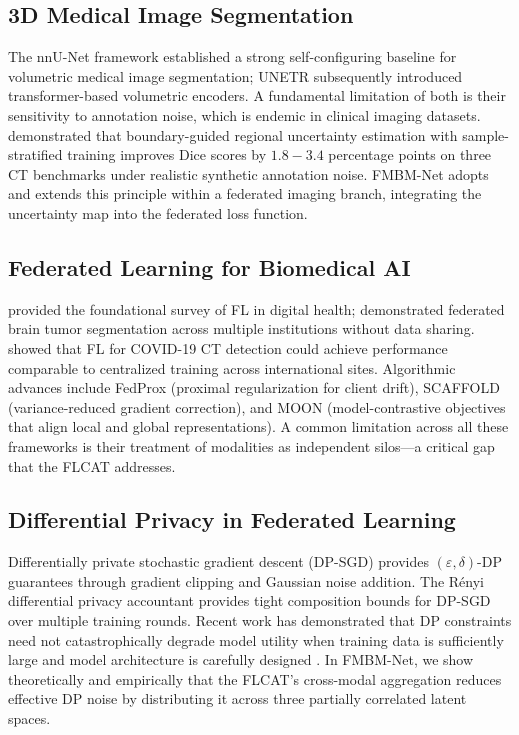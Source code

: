 \documentclass[a4paper,fleqn]{cas-dc}
\begin{document}
\subsection{3D Medical Image Segmentation}

The nnU-Net framework \citep{isensee2021nnunet} established a strong
self-configuring baseline for volumetric medical image segmentation;
UNETR \citep{hatamizadeh2022unetr} subsequently introduced transformer-based
volumetric encoders. A fundamental limitation of both is their sensitivity to
annotation noise, which is endemic in clinical imaging datasets.
\citet{rue_ct_2025} demonstrated that boundary-guided regional uncertainty
estimation with sample-stratified training improves Dice scores by
$1.8\!-\!3.4$ percentage points on three CT benchmarks under realistic
synthetic annotation noise. FMBM-Net adopts and extends this principle within a
federated imaging branch, integrating the uncertainty map into the federated
loss function.

\subsection{Federated Learning for Biomedical AI}

\citet{rieke2020fedhealth} provided the foundational survey of FL in digital
health; \citet{sheller2020braintumor} demonstrated federated brain tumor
segmentation across multiple institutions without data sharing.
\citet{dou2021fed} showed that FL for COVID-19 CT detection could achieve
performance comparable to centralized training across international sites.
Algorithmic advances include FedProx \citep{li2020fedprox} (proximal
regularization for client drift), SCAFFOLD \citep{karimireddy2020scaffold}
(variance-reduced gradient correction), and MOON \citep{li2021moon}
(model-contrastive objectives that align local and global representations).
A common limitation across all these frameworks is their treatment of modalities
as independent silos---a critical gap that the FLCAT addresses.

\subsection{Differential Privacy in Federated Learning}

Differentially private stochastic gradient descent (DP-SGD)
\citep{abadi2016dpsgd} provides $(\varepsilon,\delta)$-DP guarantees through
gradient clipping and Gaussian noise addition. The R\'{e}nyi differential
privacy accountant \citep{mironov2017renyi} provides tight composition bounds
for DP-SGD over multiple training rounds. Recent work has demonstrated that DP
constraints need not catastrophically degrade model utility when training data
is sufficiently large and model architecture is carefully designed
\citep{li2021moon}. In FMBM-Net, we show theoretically and empirically that the
FLCAT's cross-modal aggregation reduces effective DP noise by distributing it
across three partially correlated latent spaces.
\end{document}
